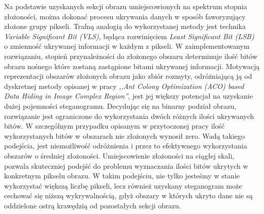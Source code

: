 {{{            %
            Na podstawie uzyskanych sekcji obrazu umiejscowionych na spektrum stopnia złożoności, można dokonać procesu
            ukrywania danych w sposób faworyzujący złożone grupy pikseli. Trafną analogią do wykorzystanej metody jest
            technika \textit{Variable Significant Bit (VLS)}, będąca rozwinięciem \textit{Least Significant Bit (LSB)} o
            zmienność ukrywanej informacji w każdym z pikseli. W zaimplementowanym rozwiązaniu, stopień przynależności
            do złożonego obszaru determinuje ilość bitów obrazu nośnego które zostaną zastąpione bitami ukrywanej
            informacji. Motywacją reprezentacji obszarów złożonych obrazu jako zbiór rozmyty, odróżniającą ją od
            dyskretnej metody opisanej w pracy \textit{,,Ant Colony Optimization (ACO) based Data Hiding in Image
            Complex Region''}\cite{Khan2018AntCO}, jest jej większy potencjał na uzyskanie dużej pojemności
            steganogramu. Decydując się na binarny podział obrazu, rozwiązanie jest ograniczone do wykorzystania dwóch
            różnych ilości ukrywanych bitów. W szczególnym przypadku opisanym w przytoczonej pracy ilość wykorzystanych
            bitów w obszarach nie złożonych wynosił zero. Wadą takiego podejścia, jest niemożliwość odróżnienia i przez
            to efektywnego wykorzystania obszarów o średniej złożoności. Umiejscowienie złożoności na ciągłej skali,
            pozwala skuteczniej podejść do problemu wyznaczania ilości bitów ukrytych w konkretnym pikselu obrazu. W
            takim podejściu, nie tylko jesteśmy w stanie wykorzystać większą liczbę pikseli, lecz również uzyskany
            steganogram może cechować się niższą wykrywalnością, gdyż obszary w których ukryto dane nie są oddzielone
            ostrą krawędzią od pozostałych sekcji obrazu.

        }

}}
